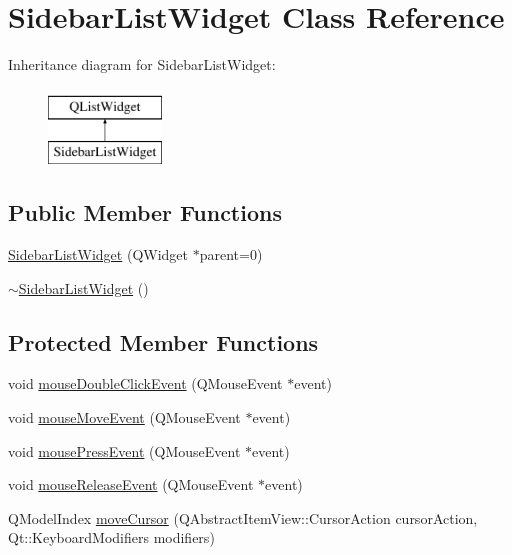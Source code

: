 \hypertarget{classSidebarListWidget}{\section{Sidebar\+List\+Widget Class Reference}
\label{classSidebarListWidget}
}
Inheritance diagram for Sidebar\+List\+Widget\+:\begin{figure}[H]
\begin{center}
\leavevmode
\includegraphics[height=2.000000cm]{classSidebarListWidget}
\end{center}
\end{figure}
\subsection*{Public Member Functions}
\begin{DoxyCompactItemize}
\item 
\hyperlink{classSidebarListWidget_a099ba8d56d7a582e5abc7625de771537}{Sidebar\+List\+Widget} (Q\+Widget $\ast$parent=0)
\item 
\hyperlink{classSidebarListWidget_a351bd0fcfcaf4e23dddfd6822829d263}{$\sim$\+Sidebar\+List\+Widget} ()
\end{DoxyCompactItemize}
\subsection*{Protected Member Functions}
\begin{DoxyCompactItemize}
\item 
void \hyperlink{classSidebarListWidget_aede5c1cbe0204e841a38991defffe380}{mouse\+Double\+Click\+Event} (Q\+Mouse\+Event $\ast$event)
\item 
void \hyperlink{classSidebarListWidget_a46c986def70ca4cc7d0e52d16f3ed943}{mouse\+Move\+Event} (Q\+Mouse\+Event $\ast$event)
\item 
void \hyperlink{classSidebarListWidget_a5718e7749f8ef17d2a680404a28dada6}{mouse\+Press\+Event} (Q\+Mouse\+Event $\ast$event)
\item 
void \hyperlink{classSidebarListWidget_abd12787ad015461ab2fbdc046c8cb6fb}{mouse\+Release\+Event} (Q\+Mouse\+Event $\ast$event)
\item 
Q\+Model\+Index \hyperlink{classSidebarListWidget_a80798d3faf893493d4d4b65b258f386c}{move\+Cursor} (Q\+Abstract\+Item\+View\+::\+Cursor\+Action cursor\+Action, Qt\+::\+Keyboard\+Modifiers modifiers)
\end{DoxyCompactItemize}


